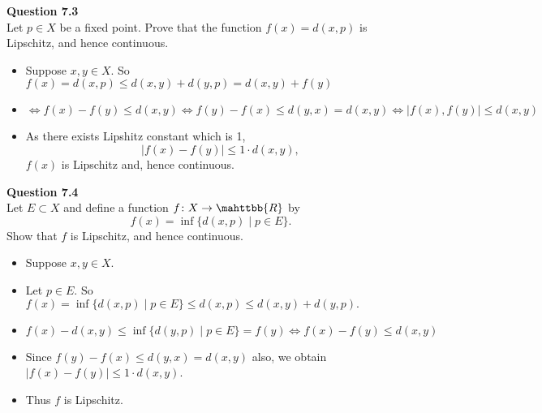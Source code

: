 \documentclass[12pt]{article}
\begin{document}
\newpage                                                                                          
\textbf{Question 7.3}\\
Let $p\in X$ be a fixed point. Prove that the function $f(x)=d(x,p)$ is Lipschitz, and hence continuous.
\begin{itemize}
    \item Suppose $x,y\in X$. So $f(x) = d(x,p) \le d(x,y)+d(y,p) = d(x,y)+ f(y)$
    \item $\Leftrightarrow f(x)-f(y) \le d(x,y) \Leftrightarrow f(y)-f(x) \le d(y,x)=d(x,y)
    \Leftrightarrow |f(x),f(y)| \le d(x,y)$
    \item As there exists Lipshitz constant which is 1, $$|f(x)-f(y)|\le 1\cdot d(x,y),$$ $f(x)$ is Lipschitz and, hence continuous.
    
\end{itemize}

\vspace{1.5\baselineskip}
\textbf{Question 7.4}\\
Let $E\subset X$ and define a function $f\colon X\rightarrow \mahttbb{R}$ by $$f(x) = \inf\{d(x,p)\;|\;p\in E\}.$$
Show that $f$ is Lipschitz, and hence continuous.
\begin{itemize}
    \item Suppose $x,y\in X$. 
    \item Let $p\in E$. So $f(x) = \inf\{d(x,p)\;|\;p\in E\}\le d(x,p) \le d(x,y)+d(y,p).$
    \item $f(x)-d(x,y)\le \inf\{d(y,p)\;|\;p\in E\} = f(y) \Leftrightarrow f(x)-f(y)\le d(x,y)$
    \item Since $f(y)-f(x)\le d(y,x)=d(x,y)$ also, we obtain $|f(x)-f(y)|\le 1\cdot d(x,y)$.
    \item Thus $f$ is Lipschitz.
    
\end{itemize}
\end{document}
